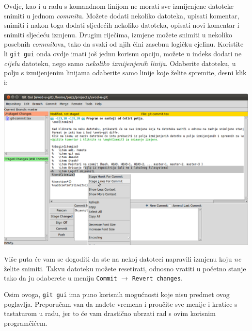 Ovdje, kao i u radu s komandnom linijom ne morati sve izmijenjene datoteke snimiti u jednom \emph{commit}u. 
Možete dodati nekoliko datoteka, upisati komentar, snimiti i nakon toga dodati sljedećih nekoliko datoteka, opisati novi komentar i snimiti sljedeću izmjenu.
Drugim riječima, izmjene možete snimiti u nekoliko posebnih \emph{commit}ova, tako da svaki od njih čini zasebnu logičku cjelinu.
Koristite li \verb+git gui+ onda ovdje imati još jednu korisnu opciju, možete u indeks dodati ne \emph{cijelu} datoteku, nego samo \emph{nekoliko izmijenjenih linija}.
Odaberite datoteku, u polju s izmijenjenim linijama odaberite samo linije koje želite spremite, desni klik i:

\includegraphics[width=14cm]{images/git-gui-stage-lines-to-commit.png}

Više puta će vam se dogoditi da ste na nekoj datoteci napravili izmjenu koju \emph{ne} želite snimiti. 
Takvu datoteku možete resetirati, odnosno vratiti u početno stanje tako da ju odaberete u meniju \verb+Commit+ $\rightarrow$ \verb+Revert changes+.

Osim ovoga, \verb+git gui+ ima puno korisnih mogućnosti koje nisu predmet ovog poglavlja.
Preporučam van da nađete vremena i proučite sve menije i kratice s tastaturom u radu, jer to će vam drastično ubrzati rad s ovim korisnim programčićem.



